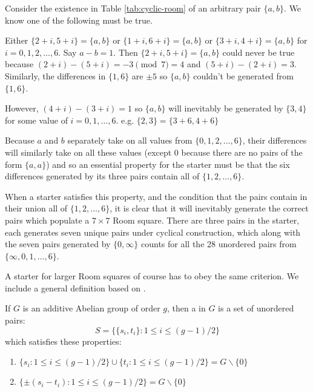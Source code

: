 Consider the existence in Table \ref{tab:cyclic-room} of an arbitrary pair $\{a, b\}$.
We know one of the following must be true.

Either $\{2 + i, 5 + i\} = \{a, b\}$ or $\{1 + i, 6 + i\} = \{a, b\}$ or $\{3 + i, 4 + i\} = \{a, b\}$ for $i = 0, 1, 2, \ldots, 6$.
Say $a - b = 1$.
Then $\{2 + i, 5 + i\} = \{a, b\}$ could never be true because $(2 + i) - (5 + i) = -3\pmod 7 = 4$ and $(5 + i) - (2 + i) = 3$.
Similarly, the differences in $\{1, 6\}$ are $\pm 5$ so $\{a, b\}$ couldn’t be generated from $\{1, 6\}$.

However, $(4 + i) - (3 + i) = 1$ so $\{a, b\}$ will inevitably be generated by $\{3, 4\}$ for some value of $i = 0, 1, \ldots, 6$.
e.g. $\{2, 3\} = \{3 + 6, 4 + 6\}$

Because $a$ and $b$ separately take on all values from $\{0, 1, 2, \ldots, 6\}$, their differences will similarly take on all these values (except 0 because there are no pairs of the form $\{a, a\}$) and so an essential property for the starter must be that the six differences generated by its three pairs contain all of $\{1, 2, \ldots, 6\}$.

When a starter satisfies this property, and the condition that the pairs contain in their union all of $\{1, 2, \ldots, 6\}$, it is clear that it will inevitably generate the correct pairs which populate a $7 \times 7$ Room square. 
There are three pairs in the starter, each generates seven unique pairs under cyclical construction, which along with the seven pairs generated by $\{0, \infty\}$ counts for all the 28 unordered pairs from $\{\infty, 0, 1, \ldots, 6\}$.

A starter for larger Room squares of course has to obey the same criterion.
We include a general definition based on
\cite{dinitzContemporaryDesignTheory1992}.

If $G$ is an additive Abelian group of order $g$, then a  in $G$ is a set of unordered pairs:
\begin{equation*}
S = \{\{s_i, t_i\}:1 \leq i \leq (g - 1)/2\}
\end{equation*}
which satisfies these properties:

\begin{enumerate}
  \item{$\{s_i:1 \leq i \leq (g-1)/2\} \cup \{t_i : 1 \leq i \leq (g-1)/2\} = G \backslash \{0\}$}
  \item{$\{\pm (s_i - t_i ) : 1 \leq i \leq (g-1)/2 \} = G \backslash \{0\}$}
\end{enumerate}

